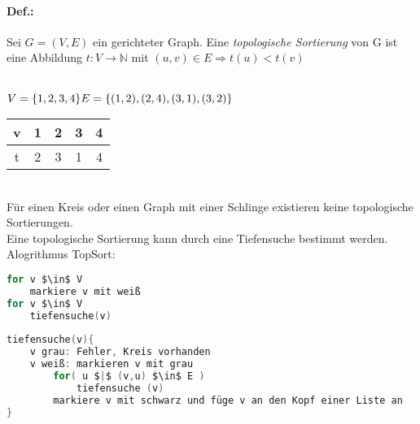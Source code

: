 \documentclass{scrreprt}
\begin{document}
\paragraph{Def.:} Sei $G=(V,E)$ ein gerichteter Graph. Eine \emph{topologische Sortierung} von G ist eine Abbildung $t: V\rightarrow \mathbb{N} $ mit $ (u,v) \in E \Rightarrow t(u) < t(v)$\\
\\
$V= \{1,2,3,4\}\\
E=\{(1,2), (2,4), (3,1), (3,2)\}
$\\
\begin{tabular}{c | c c c c}
v & 1 & 2 & 3 & 4 \\
\hline
t & 2 & 3 & 1 & 4
\end{tabular}\medskip\\
Für einen Kreis oder einen Graph mit einer Schlinge existieren keine topologische Sortierungen.\medskip\\
Eine topologische Sortierung kann durch eine Tiefensuche bestimmt werden.\\
Alogrithmus TopSort:
\begin{lstlisting}[language=C]
for v $\in$ V
	markiere v mit weiß
for v $\in$ V
	tiefensuche(v)
	
tiefensuche(v){
	v grau: Fehler, Kreis vorhanden
	v weiß: markieren v mit grau
		for( u $|$ (v,u) $\in$ E )
			tiefensuche (v)
		markiere v mit schwarz und füge v an den Kopf einer Liste an
}
\end{lstlisting}
\end{document}
